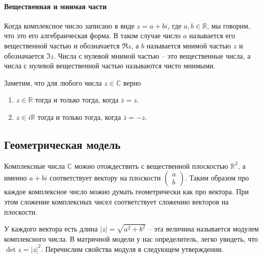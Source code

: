 \paragraph{Вещественная и мнимая части}

Когда комплексное число записано в виде $z = a + bi$, где $a,b\in\mathbb R$, мы говорим, что это его алгебраическая форма.
В таком случае число $a$ называется его вещественной частью и обозначается $\Re z$, а $b$ называется мнимой частью $z$ и обозначается $\Im z$.
Числа с нулевой мнимой частью -- это вещественные числа, а числа с нулевой вещественной частью называются чисто мнимыми.

Заметим, что для любого числа $z\in\mathbb C$ верно
\begin{enumerate}
\item $z\in \mathbb R$ тогда и только тогда, когда $\bar z= z$.

\item $z\in i\mathbb R$ тогда и только тогда, когда $\bar z = - z$.
\end{enumerate}

\subsection{Геометрическая модель}
\label{section::ComplexGeom}

Комплексные числа $\mathbb C$ можно отождествить с вещественной плоскостью $\mathbb R^2$, а именно $a+bi$ соответствует вектору на плоскости $\left(\begin{smallmatrix}a\\b\end{smallmatrix}\right)$.
Таким образом про каждое комплексное число можно думать геометрически как про вектора.
При этом сложение комплексных чисел соответствует сложению векторов на плоскости.

У каждого вектора есть длина $|z| = \sqrt{a^2 + b^2}$ -- эта величина называется модулем комплексного числа.
В матричной модели у нас определитель, легко увидеть, что $\det z = |z|^2$.
Перечислим свойства модуля в следующем утверждении.

